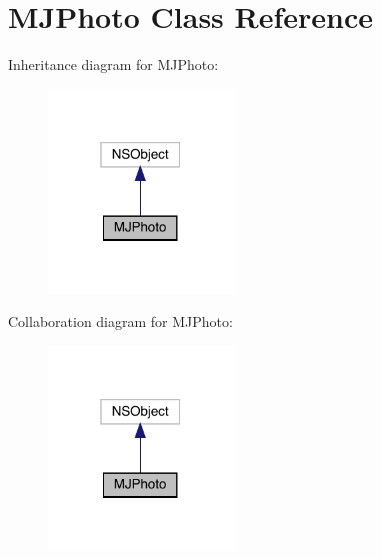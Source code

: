 \hypertarget{interface_m_j_photo}{}\section{M\+J\+Photo Class Reference}
\label{interface_m_j_photo}


Inheritance diagram for M\+J\+Photo\+:\nopagebreak
\begin{figure}[H]
\begin{center}
\leavevmode
\includegraphics[width=139pt]{interface_m_j_photo__inherit__graph}
\end{center}
\end{figure}


Collaboration diagram for M\+J\+Photo\+:\nopagebreak
\begin{figure}[H]
\begin{center}
\leavevmode
\includegraphics[width=139pt]{interface_m_j_photo__coll__graph}
\end{center}
\end{figure}
